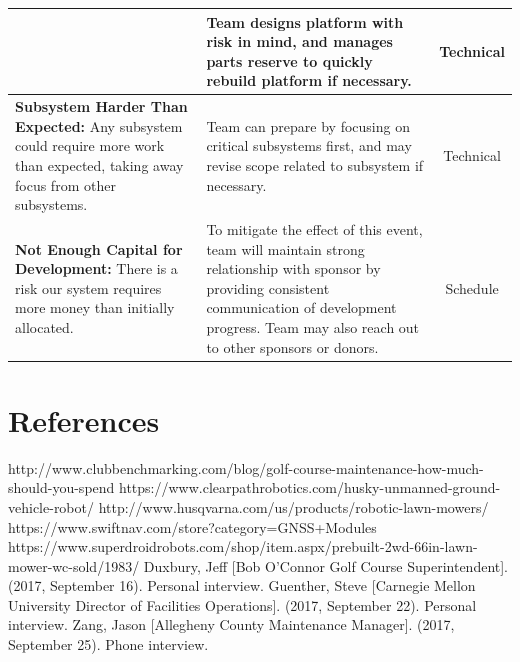 \documentclass[12pt]{extarticle}
\begin{document}
\begin{tabular}{p{7cm}|p{6cm}|c}
&
Team designs platform with risk in mind, and manages parts reserve to quickly rebuild platform if necessary.
&
Technical\\
\hline
\textbf{Subsystem Harder Than Expected:} 
Any subsystem could require more work than expected, taking away focus from other subsystems.
&
Team can prepare by focusing on critical subsystems first, and may revise scope related to subsystem if necessary.
&
Technical\\
\hline
\textbf{Not Enough Capital for Development:} 
There is a risk our system requires more money than initially allocated.
&
To mitigate the effect of this event, team will maintain strong relationship with sponsor by providing consistent communication of development progress. Team may also reach out to other sponsors or donors.
&
Schedule\\
\end{tabular}

\begingroup
\newpage
\section{References}
\renewcommand{\section}[2]{}%
\begin{thebibliography}{}
http://www.clubbenchmarking.com/blog/golf-course-maintenance-how-much-should-you-spend
https://www.clearpathrobotics.com/husky-unmanned-ground-vehicle-robot/
http://www.husqvarna.com/us/products/robotic-lawn-mowers/
https://www.swiftnav.com/store?category=GNSS+Modules
https://www.superdroidrobots.com/shop/item.aspx/prebuilt-2wd-66in-lawn-mower-wc-sold/1983/
Duxbury, Jeff [Bob O’Connor Golf Course Superintendent]. (2017, September 16). Personal interview.
Guenther, Steve [Carnegie Mellon University Director of Facilities Operations]. (2017, September 22). Personal interview.
Zang, Jason [Allegheny County Maintenance Manager]. (2017, September 25). Phone interview.
\end{thebibliography}
\endgroup
\end{document}
